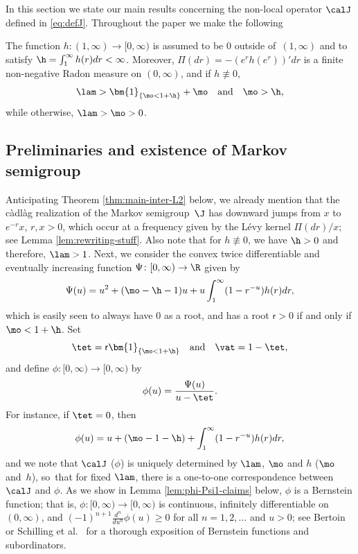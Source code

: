 In this section we state our main results concerning the non-local operator $\calJ$ defined in \eqref{eq:defJ}.
Throughout the paper we make the following
\begin{assmp}
\label{assA}
The function $h \colon (1,\infty)\!\to\![0,\infty)$ is assumed to be $0$ outside of~$(1,\infty)$ and to satisfy
$\h = \int_1^\infty h(r)dr < \infty$. Moreover, $\Pi(dr) = -(e^rh(e^r))'dr$ is a finite non-negative Radon
measure on $(0,\infty)$, and if $h \not\equiv 0$,
\begin{equation*}
\lam > \bm{1}_{\{\mo < 1+\h\}} + \mo \quad \text{and} \quad \mo > \h,
\end{equation*}
while otherwise, $\lam > \mo > 0$.
\end{assmp}

\subsection{Preliminaries and existence of Markov semigroup}

Anticipating Theorem \ref{thm:main-inter-L2} below, we already mention that the càdlàg realization of the Markov semigroup~$\J$ has downward jumps from $x$ to $e^{-r}x$, $r,x > 0$, which occur at a frequency given by the Lévy kernel $\Pi(dr)/x$; see Lemma \ref{lem:rewriting-stuff}. Also note that for $h \not\equiv 0$, we have $\h >0$ and therefore, $\lam >1$. Next, we consider the convex twice differentiable and eventually increasing function $\Psi \colon [0,\infty) \to \R$ given by
\begin{equation}
\label{eq:defpsi}
\Psi(u) = u^2 + (\mo-\h-1)u + u \int_1^\infty (1-r^{-u})h(r)dr,
\end{equation}
which is easily seen to always have 0 as a root, and has a root $\mathsf{r} > 0$ if and only if $\mo < 1 + \h$. Set
\begin{equation}
\label{eq:def-root}
\tet = \mathsf{r}\bm{1}_{\{\mo < 1+\h\}} \quad \text{and} \quad \vat = 1-\tet,
\end{equation}
and define $\phi \colon [0,\infty) \to [0,\infty)$ by
\begin{equation}
\label{eq:def-phi}
\phi(u) = \frac{\Psi(u)}{u-\tet}.
\end{equation}
For instance, if $\tet = 0$, then
\begin{equation*}
\phi(u) = u + (\mo-1-\h) + \int_1^\infty (1-r^{-u})h(r)dr,
\end{equation*}
and we note that $\calJ$ (\resp $\phi$) is uniquely determined by $\lam$, $\mo$ and $h$ (\resp $\mo$ and~$h$), so~that for fixed $\lam$, there is a one-to-one correspondence between $\calJ$ and $\phi$. As we show in Lemma \ref{lem:phi-Psi1-claims} below, $\phi$ is a Bernstein function; that is, $\phi \colon [0,\infty) \to [0,\infty)$ is continuous, infinitely differentiable on $(0, \infty)$, and $(-1)^{n+1}\frac{d^n }{du^n}\phi(u)\geq 0$ for all $n = 1,2,\ldots$ and $u > 0$; see Bertoin \cite{Bertoin-s} or Schilling et al.~\cite{SchillingSongVondracek10} for a thorough exposition of Bernstein functions and subordinators.

